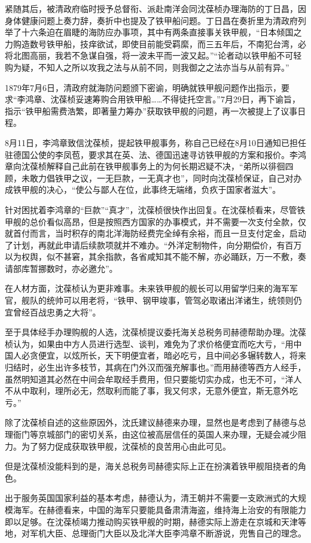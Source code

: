 \documentclass[12pt,UTF8]{ctexbook}
\begin{document}
紧随其后，被清政府临时授予总督衔、派赴南洋会同沈葆桢办理海防的丁日昌，因身体健康问题上奏力辞，奏折中也提及了铁甲船问题。丁日昌在奏折里为清政府列举了十六条迫在眉睫的海防应办事项，其中有两条直接事关铁甲舰，“日本倾国之力购造数号铁甲船，技痒欲试，即使目前能受羁縻，而三五年后，不南犯台湾，必将北图高丽，我若不急谋自强，将一波未平而一波又起。”“论者动以铁甲船不可轻购为疑，不知人之所以攻我之法与从前不同，则我御之之法亦当与从前有异。”

1879年7月6日，清政府就海防问题颁下密谕，明确就铁甲舰问题作出指示，要求“李鸿章、沈葆桢妥速筹购合用铁甲船……不得徒托空言。”7月29日，再下谕旨，指示“铁甲船需费浩繁，即著量力筹办”获取铁甲舰的问题，再一次被提上了议事日程。

8月11日，李鸿章致信沈葆桢，提起铁甲舰事务，称自己已经在8月10日通知已担任驻德国公使的李凤苞，要求其在英、法、德国迅速寻访铁甲舰的方案和报价。李鸿章向沈葆桢解释自己此前在铁甲舰事务上的为何长期迟疑不决，“弟所以徘徊四顾，未敢力倡铁甲之议，一无巨款，一无真才也”，同时向沈葆桢保证，自己对办成铁甲舰的决心，“使公与鄙人在位，此事终无端绪，负疚于国家者滋大”。

针对困扰着李鸿章的“巨款”“真才”，沈葆桢很快作出回复。在沈葆桢看来，尽管铁甲舰的总价看似高昂，但是按照西方国家的办事模式，并不需要一次支付全款，仅就首付而言，当时积存的南北洋海防经费完全绰有余裕，而且一旦支付定金，启动了计划，再就此申请后续款项就并不难办。“外洋定制物件，向分期偿价，有百万以为权舆，似不甚窘，其余指款，各省咸知其不能不解，亦必踊跃，万一不敷，奏请部库暂挪数时，亦必邀允”。

在人材方面，沈葆桢认为更非难事。未来铁甲舰的舰长可以用留学归来的海军军官，舰队的统帅可以用老将，“铁甲、钢甲竣事，管驾必取诸出洋诸生，统领则仍宜曾经百战忠勇之大将”。

至于具体经手办理购舰的人选，沈葆桢提议委托海关总税务司赫德帮助办理。沈葆桢认为，如果由中方人员进行选型、谈判，难免为了求价格便宜而吃大亏，“用中国人必贪便宜，以炫所长，天下明便宜者，暗必吃亏，且中间必多辗转数人，将来归结时，必生出许多枝节，其病在门外汉而强充解事也。”而用赫德等西方人经手，虽然明知道其必然在中间会牟取经手费用，但只要能切实办成，也无不可，“洋人不从中取利，理所必无，然取利而能了事，我又何求，无意外便宜，斯无意外吃亏。”

除了沈葆桢自述的这些原因外，沈氏建议赫德来办理，显然也是考虑到了赫德与总理衙门等京城部门的密切关系，由这位被高层信任的英国人来办理，无疑会减少阻力。为了努力促成获取铁甲舰，沈葆桢的良苦用心由此可见。

但是沈葆桢没能料到的是，海关总税务司赫德实际上正在扮演着铁甲舰阻挠者的角色。

出于服务英国国家利益的基本考虑，赫德认为，清王朝并不需要一支欧洲式的大规模海军。在赫德看来，中国的海军只要能具备肃清海盗，维持海上治安的有限能力即以足够。在沈葆桢竭力推动购买铁甲舰的时期，赫德实际上游走在京城和天津等地，对军机大臣、总理衙门大臣以及北洋大臣李鸿章不断游说，兜售自己的理念。
\end{document}
